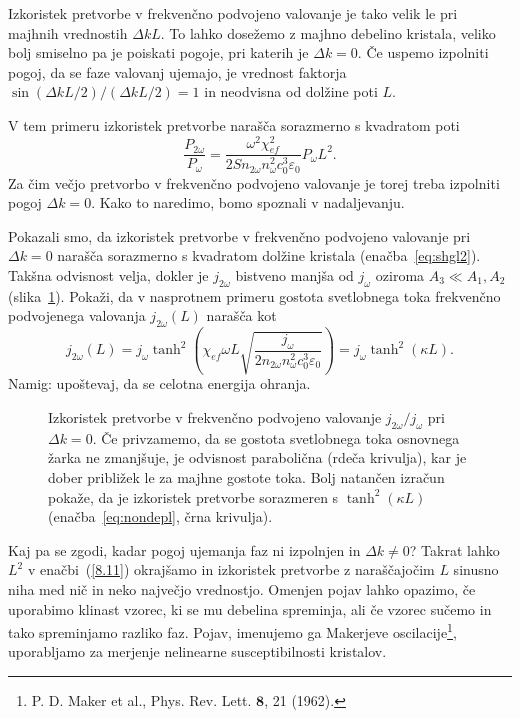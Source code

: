 Izkoristek pretvorbe v frekvenčno podvojeno valovanje je tako velik le pri  majhnih vred\-no\-stih 
$\Delta kL$. To lahko dosežemo z majhno debelino kristala, veliko bolj smiselno
pa je poiskati pogoje, pri katerih je $\Delta k = 0$. Če uspemo izpolniti pogoj, da
se faze valovanj ujemajo, je vrednost faktorja 
$\sin(\Delta kL/2)/(\Delta kL/2)=1$ in neodvisna od dolžine poti $L$.

V tem primeru izkoristek pretvorbe narašča sorazmerno s kvadratom poti
\begin{equation}
\frac{P_{2\omega}}{P_{\omega}}=
\frac{\omega^2 \chi_{ef}^2}{2 S n_{2\omega} n_\omega^2c_0^3\varepsilon_0} P_\omega L^2.
\label{eq:shgl2}
\end{equation}
Za čim večjo pretvorbo v frekvenčno podvojeno valovanje je torej treba 
izpolniti pogoj $\Delta k = 0$. Kako to naredimo,
bomo spoznali v nadaljevanju.

\begin{definition}
\label{deplet}
Pokazali smo, da izkoristek pretvorbe v frekvenčno podvojeno valovanje 
pri $\Delta k = 0$  narašča sorazmerno s kvadratom 
dolžine kristala (enačba~\ref{eq:shgl2}). Takšna odvisnost velja, 
dokler je $j_{2\omega}$ bistveno manjša od $j_{\omega}$ oziroma $A_3 \ll A_1, A_2$ (slika~\ref{fig:shg2dep}). 
Pokaži, da v nasprotnem primeru gostota svetlobnega toka frekvenčno
podvojenega valovanja $j_{2\omega}(L)$ narašča kot
\begin{equation}
j_{2\omega} (L) = j_\omega \tanh^2 \left(\chi_{ef}\omega L \sqrt{\frac{j_\omega}
{2 n_{2\omega} n_\omega^2 c_0^3 \varepsilon_0}} \right) = j_\omega \tanh^2(\kappa L).
\label{eq:nondepl}
\end{equation}
Namig: upoštevaj, da se celotna energija ohranja.
\end{definition}

\begin{figure}[h]
\centering
\def\svgwidth{72truemm} 

\caption{Izkoristek pretvorbe v frekvenčno podvojeno valovanje $j_{2\omega}/j_\omega$ 
pri $\Delta k = 0$.
Če privzamemo, da se gostota svetlobnega toka osnovnega žarka ne zmanjšuje, 
je odvisnost parabolična (rdeča krivulja), kar 
je dober približek le za majhne gostote toka. Bolj natančen izračun pokaže, da je izkoristek 
pretvorbe sorazmeren s $\tanh^2(\kappa L)$ (enačba~\ref{eq:nondepl}, črna krivulja).}
\label{fig:shg2dep}
\end{figure}

Kaj pa se zgodi, kadar pogoj ujemanja faz ni izpolnjen in 
 $\Delta k \neq 0$? Takrat lahko  $L^2$ v enačbi~(\ref{8.11})
okrajšamo in izkoristek pretvorbe z naraščajočim
$L$ sinusno niha med nič in neko največjo vrednostjo. Omenjen pojav lahko opazimo, če
uporabimo klinast vzorec, ki se mu debelina spreminja, ali če vzorec sučemo 
in tako spreminjamo razliko faz. Pojav, imenujemo ga Makerjeve 
oscilacije\footnote{P. D. Maker et al., Phys. Rev. Lett. $\mathbf{8}$, 21 (1962).}, 
uporabljamo za merjenje nelinearne susceptibilnosti kristalov.

